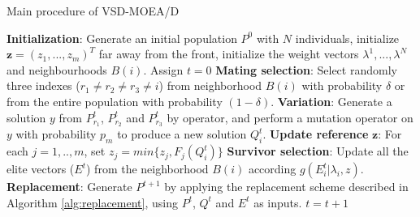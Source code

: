 \begin{algorithm}[!t]
        \caption{Main procedure of VSD-MOEA/D} 
        \begin{small}
\begin{algorithmic}[1]
	\STATE \textbf{Initialization}: Generate an initial population $P^0$ with $N$ individuals, initialize $\mathbf{z} = (z_1, ..., z_m)^T$ far away from the front, initialize the weight vectors $\lambda^1, ..., \lambda^N $ and neighbourhoods $B(i)$. \label{alg_1:1}
        \STATE Assign $t=0$ \label{alg_1:2}
         \label{alg_1:3}
               \STATE \textbf{Mating selection}: Select randomly three indexes ($r_1 \neq r_2 \neq r_3 \neq i$) from neighborhood $B(i)$ with probability $\delta$ or from the entire population with probability $(1-\delta)$. \label{alg_1:4}
	       \STATE \textbf{Variation}: Generate a solution $y$ from $P^t_{r_1}$, $P^t_{r_2}$ and $P^t_{r_3}$ by \DE{} operator, and perform a mutation operator on $y$ with probability $p_m$ to produce a new solution $Q^t_{i}$. \label{alg_1:5}
	       \STATE \textbf{Update reference} $\mathbf{z}$: For each $j=1, .., m$, set $z_j = min\{z_j, F_j(Q^t_i) \}$ \label{alg_1:6}
	       \STATE \textbf{Survivor selection}: Update all the elite vectors ($E^t$) from the neighborhood $B(i)$ according $g(E^t_i | \lambda_i, z)$. \label{alg_1:6}
	   \ENDFOR
	   \STATE \textbf{Replacement}: Generate $P^{t+1}$ by applying the replacement scheme described in  Algorithm \ref{alg:replacement}, using $P^t$, $Q^t$ and $E^t$ as inputs. \label{alg_1:7}
           \STATE $t=t+1$ \label{alg_1:8}
        \ENDWHILE \label{alg_1:9}
        \end{algorithmic}
        \end{small}
\label{alg:vsd-moea}
\end{algorithm}




